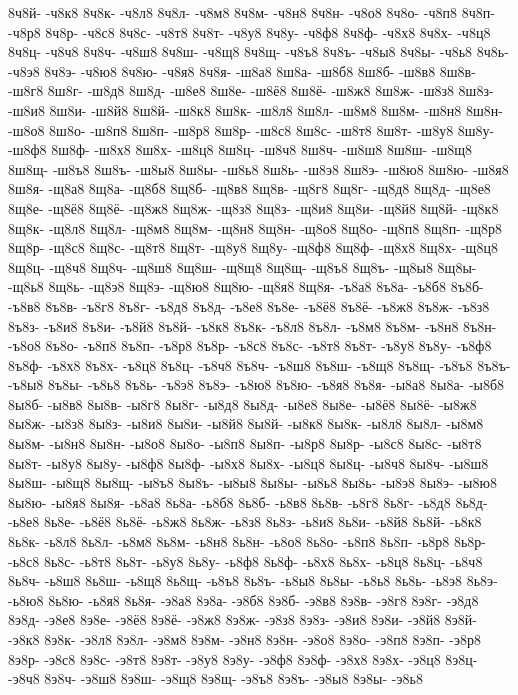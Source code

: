 {8ч8й-
-ч8к8
8ч8к-
-ч8л8
8ч8л-
-ч8м8
8ч8м-
-ч8н8
8ч8н-
-ч8о8
8ч8о-
-ч8п8
8ч8п-
-ч8р8
8ч8р-
-ч8с8
8ч8с-
-ч8т8
8ч8т-
-ч8у8
8ч8у-
-ч8ф8
8ч8ф-
-ч8х8
8ч8х-
-ч8ц8
8ч8ц-
-ч8ч8
8ч8ч-
-ч8ш8
8ч8ш-
-ч8щ8
8ч8щ-
-ч8ъ8
8ч8ъ-
-ч8ы8
8ч8ы-
-ч8ь8
8ч8ь-
-ч8э8
8ч8э-
-ч8ю8
8ч8ю-
-ч8я8
8ч8я-
-ш8а8
8ш8а-
-ш8б8
8ш8б-
-ш8в8
8ш8в-
-ш8г8
8ш8г-
-ш8д8
8ш8д-
-ш8е8
8ш8е-
-ш8ё8
8ш8ё-
-ш8ж8
8ш8ж-
-ш8з8
8ш8з-
-ш8и8
8ш8и-
-ш8й8
8ш8й-
-ш8к8
8ш8к-
-ш8л8
8ш8л-
-ш8м8
8ш8м-
-ш8н8
8ш8н-
-ш8о8
8ш8о-
-ш8п8
8ш8п-
-ш8р8
8ш8р-
-ш8с8
8ш8с-
-ш8т8
8ш8т-
-ш8у8
8ш8у-
-ш8ф8
8ш8ф-
-ш8х8
8ш8х-
-ш8ц8
8ш8ц-
-ш8ч8
8ш8ч-
-ш8ш8
8ш8ш-
-ш8щ8
8ш8щ-
-ш8ъ8
8ш8ъ-
-ш8ы8
8ш8ы-
-ш8ь8
8ш8ь-
-ш8э8
8ш8э-
-ш8ю8
8ш8ю-
-ш8я8
8ш8я-
-щ8а8
8щ8а-
-щ8б8
8щ8б-
-щ8в8
8щ8в-
-щ8г8
8щ8г-
-щ8д8
8щ8д-
-щ8е8
8щ8е-
-щ8ё8
8щ8ё-
-щ8ж8
8щ8ж-
-щ8з8
8щ8з-
-щ8и8
8щ8и-
-щ8й8
8щ8й-
-щ8к8
8щ8к-
-щ8л8
8щ8л-
-щ8м8
8щ8м-
-щ8н8
8щ8н-
-щ8о8
8щ8о-
-щ8п8
8щ8п-
-щ8р8
8щ8р-
-щ8с8
8щ8с-
-щ8т8
8щ8т-
-щ8у8
8щ8у-
-щ8ф8
8щ8ф-
-щ8х8
8щ8х-
-щ8ц8
8щ8ц-
-щ8ч8
8щ8ч-
-щ8ш8
8щ8ш-
-щ8щ8
8щ8щ-
-щ8ъ8
8щ8ъ-
-щ8ы8
8щ8ы-
-щ8ь8
8щ8ь-
-щ8э8
8щ8э-
-щ8ю8
8щ8ю-
-щ8я8
8щ8я-
-ъ8а8
8ъ8а-
-ъ8б8
8ъ8б-
-ъ8в8
8ъ8в-
-ъ8г8
8ъ8г-
-ъ8д8
8ъ8д-
-ъ8е8
8ъ8е-
-ъ8ё8
8ъ8ё-
-ъ8ж8
8ъ8ж-
-ъ8з8
8ъ8з-
-ъ8и8
8ъ8и-
-ъ8й8
8ъ8й-
-ъ8к8
8ъ8к-
-ъ8л8
8ъ8л-
-ъ8м8
8ъ8м-
-ъ8н8
8ъ8н-
-ъ8о8
8ъ8о-
-ъ8п8
8ъ8п-
-ъ8р8
8ъ8р-
-ъ8с8
8ъ8с-
-ъ8т8
8ъ8т-
-ъ8у8
8ъ8у-
-ъ8ф8
8ъ8ф-
-ъ8х8
8ъ8х-
-ъ8ц8
8ъ8ц-
-ъ8ч8
8ъ8ч-
-ъ8ш8
8ъ8ш-
-ъ8щ8
8ъ8щ-
-ъ8ъ8
8ъ8ъ-
-ъ8ы8
8ъ8ы-
-ъ8ь8
8ъ8ь-
-ъ8э8
8ъ8э-
-ъ8ю8
8ъ8ю-
-ъ8я8
8ъ8я-
-ы8а8
8ы8а-
-ы8б8
8ы8б-
-ы8в8
8ы8в-
-ы8г8
8ы8г-
-ы8д8
8ы8д-
-ы8е8
8ы8е-
-ы8ё8
8ы8ё-
-ы8ж8
8ы8ж-
-ы8з8
8ы8з-
-ы8и8
8ы8и-
-ы8й8
8ы8й-
-ы8к8
8ы8к-
-ы8л8
8ы8л-
-ы8м8
8ы8м-
-ы8н8
8ы8н-
-ы8о8
8ы8о-
-ы8п8
8ы8п-
-ы8р8
8ы8р-
-ы8с8
8ы8с-
-ы8т8
8ы8т-
-ы8у8
8ы8у-
-ы8ф8
8ы8ф-
-ы8х8
8ы8х-
-ы8ц8
8ы8ц-
-ы8ч8
8ы8ч-
-ы8ш8
8ы8ш-
-ы8щ8
8ы8щ-
-ы8ъ8
8ы8ъ-
-ы8ы8
8ы8ы-
-ы8ь8
8ы8ь-
-ы8э8
8ы8э-
-ы8ю8
8ы8ю-
-ы8я8
8ы8я-
-ь8а8
8ь8а-
-ь8б8
8ь8б-
-ь8в8
8ь8в-
-ь8г8
8ь8г-
-ь8д8
8ь8д-
-ь8е8
8ь8е-
-ь8ё8
8ь8ё-
-ь8ж8
8ь8ж-
-ь8з8
8ь8з-
-ь8и8
8ь8и-
-ь8й8
8ь8й-
-ь8к8
8ь8к-
-ь8л8
8ь8л-
-ь8м8
8ь8м-
-ь8н8
8ь8н-
-ь8о8
8ь8о-
-ь8п8
8ь8п-
-ь8р8
8ь8р-
-ь8с8
8ь8с-
-ь8т8
8ь8т-
-ь8у8
8ь8у-
-ь8ф8
8ь8ф-
-ь8х8
8ь8х-
-ь8ц8
8ь8ц-
-ь8ч8
8ь8ч-
-ь8ш8
8ь8ш-
-ь8щ8
8ь8щ-
-ь8ъ8
8ь8ъ-
-ь8ы8
8ь8ы-
-ь8ь8
8ь8ь-
-ь8э8
8ь8э-
-ь8ю8
8ь8ю-
-ь8я8
8ь8я-
-э8а8
8э8а-
-э8б8
8э8б-
-э8в8
8э8в-
-э8г8
8э8г-
-э8д8
8э8д-
-э8е8
8э8е-
-э8ё8
8э8ё-
-э8ж8
8э8ж-
-э8з8
8э8з-
-э8и8
8э8и-
-э8й8
8э8й-
-э8к8
8э8к-
-э8л8
8э8л-
-э8м8
8э8м-
-э8н8
8э8н-
-э8о8
8э8о-
-э8п8
8э8п-
-э8р8
8э8р-
-э8с8
8э8с-
-э8т8
8э8т-
-э8у8
8э8у-
-э8ф8
8э8ф-
-э8х8
8э8х-
-э8ц8
8э8ц-
-э8ч8
8э8ч-
-э8ш8
8э8ш-
-э8щ8
8э8щ-
-э8ъ8
8э8ъ-
-э8ы8
8э8ы-
-э8ь8
}
